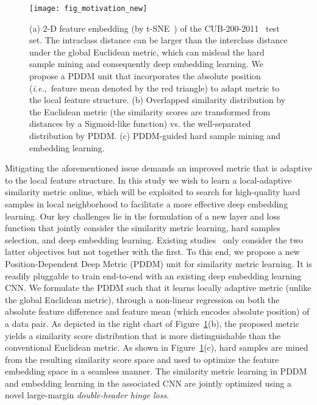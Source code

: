 \documentclass{article}
\newcommand{\ie}{\emph{i.e.}}
\begin{document}
\begin{figure}[t]
\begin{center}
\texttt{[image: fig\_motivation\_new]}
\end{center}
\vskip -0.2cm
\caption{(a) 2-D feature embedding (by t-SNE~\cite{ictdbid2777}) of the CUB-200-2011~\cite{WahCUB2002011} test set. The intraclass distance can be larger than the interclass distance under the global Euclidean metric, which can mislead the hard sample mining and consequently deep embedding learning. We propose a PDDM unit that incorporates the absolute position (\ie,~feature mean denoted by the red triangle) to adapt metric to the local feature structure. (b) Overlapped similarity distribution by the Euclidean metric (the similarity scores are transformed from distances by a Sigmoid-like function) vs. the well-separated distribution by PDDM. (c) PDDM-guided hard sample mining and embedding learning.}
\label{fig_motivation}
\vspace{-1em}
\end{figure}


Mitigating the aforementioned issue demands an improved metric that is adaptive to the local feature structure. In this study we wish to learn a local-adaptive similarity metric online, which will be exploited to search for high-quality hard samples in local neighborhood to facilitate a more effective deep embedding learning.
Our key challenges lie in the formulation of a new layer and loss function that jointly consider the similarity metric learning, hard samples selection, and deep embedding learning.
Existing studies~\cite{huang2016lmle,Wang2014,Schroff2015,songCVPR16,huang2016unsupervised} only consider the two latter objectives but not together with the first.
To this end, we propose a new Position-Dependent Deep Metric (PDDM) unit for similarity metric learning. It is readily pluggable to train end-to-end with an existing deep embedding learning CNN.
We formulate the PDDM such that it learns locally adaptive metric (unlike the global Euclidean metric), through a non-linear regression on both the absolute feature difference and feature mean (which encodes absolute position) of a data pair.
As depicted in the right chart of Figure~\ref{fig_motivation}(b), the proposed metric yields a similarity score distribution that is more distinguishable than the conventional Euclidean metric.
As shown in Figure~\ref{fig_motivation}(c), hard samples are mined from the resulting similarity score space and used to optimize the feature embedding space in a seamless manner. The similarity metric learning in PDDM and embedding learning in the associated CNN are jointly optimized using a novel large-margin \emph{double-header hinge loss}.
\end{document}
